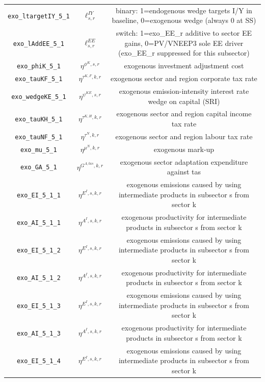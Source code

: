 \begin{center}
\begin{longtable}{ccc}
\texttt{exo\_ltargetIY\_5\_1} & ${\ell^{IY}_{s,r}}$ & binary: 1=endogenous wedge targets I/Y in baseline, 0=exogenous wedge (always 0 at SS)\\
\texttt{exo\_lAddEE\_5\_1} & ${\ell^{EE}_{s,r}}$ & switch: 1=exo\_EE\_r additive to sector EE gains, 0=PV/VNEEP3 sole EE driver (exo\_EE\_r suppressed for this subsector)\\
\texttt{exo\_phiK\_5\_1} & ${\eta^{\phi^{K},{s,r}}}$ & exogenous investment adjustment cost\\
\texttt{exo\_tauKF\_5\_1} & ${\eta^{\tau^{K,F},k,r}}$ & exogenous sector and region corporate tax rate\\
\texttt{exo\_wedgeKE\_5\_1} & ${\eta^{\psi^{KE},s,r}}$ & exogenous emission-intensity interest rate wedge on capital (SRI)\\
\texttt{exo\_tauKH\_5\_1} & ${\eta^{\tau^{K,H},k,r}}$ & exogenous sector and region capital income tax rate\\
\texttt{exo\_tauNF\_5\_1} & ${\eta^{\tau^{N},k,r}}$ & exogenous sector and region labour tax rate\\
\texttt{exo\_mu\_5\_1} & ${\eta^{\mu^{N},k,r}}$ & exogenous mark-up\\
\texttt{exo\_GA\_5\_1} & ${\eta^{G^{A,tas},k,r}}$ & exogenous sector adaptation expenditure against tas\\
\texttt{exo\_EI\_5\_1\_1} & ${\eta^{E^{I},s,k,r}}$ & exogenous emissions caused by using intermediate products in subsector s from sector k\\
\texttt{exo\_AI\_5\_1\_1} & ${\eta^{A^{I},s,k,r}}$ & exogenous productivity for intermediate products in subsector s from sector k\\
\texttt{exo\_EI\_5\_1\_2} & ${\eta^{E^{I},s,k,r}}$ & exogenous emissions caused by using intermediate products in subsector s from sector k\\
\texttt{exo\_AI\_5\_1\_2} & ${\eta^{A^{I},s,k,r}}$ & exogenous productivity for intermediate products in subsector s from sector k\\
\texttt{exo\_EI\_5\_1\_3} & ${\eta^{E^{I},s,k,r}}$ & exogenous emissions caused by using intermediate products in subsector s from sector k\\
\texttt{exo\_AI\_5\_1\_3} & ${\eta^{A^{I},s,k,r}}$ & exogenous productivity for intermediate products in subsector s from sector k\\
\texttt{exo\_EI\_5\_1\_4} & ${\eta^{E^{I},s,k,r}}$ & exogenous emissions caused by using intermediate products in subsector s from sector k\\

\end{longtable}
\end{center}
